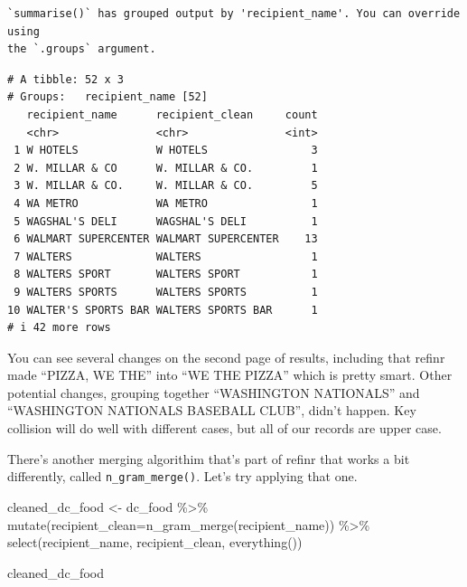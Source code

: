 \documentclass[
  letterpaper,
  DIV=11,
  numbers=noendperiod]{scrreprt}
\newenvironment{Shaded}{\begin{snugshade}}{\end{snugshade}}
\newcommand{\AttributeTok}[1]{\textcolor[rgb]{0.40,0.45,0.13}{#1}}
\newcommand{\FunctionTok}[1]{\textcolor[rgb]{0.28,0.35,0.67}{#1}}
\newcommand{\NormalTok}[1]{\textcolor[rgb]{0.00,0.23,0.31}{#1}}
\newcommand{\OtherTok}[1]{\textcolor[rgb]{0.00,0.23,0.31}{#1}}
\newcommand{\SpecialCharTok}[1]{\textcolor[rgb]{0.37,0.37,0.37}{#1}}
\begin{document}
\begin{verbatim}
`summarise()` has grouped output by 'recipient_name'. You can override using
the `.groups` argument.
\end{verbatim}

\begin{verbatim}
# A tibble: 52 x 3
# Groups:   recipient_name [52]
   recipient_name      recipient_clean     count
   <chr>               <chr>               <int>
 1 W HOTELS            W HOTELS                3
 2 W. MILLAR & CO      W. MILLAR & CO.         1
 3 W. MILLAR & CO.     W. MILLAR & CO.         5
 4 WA METRO            WA METRO                1
 5 WAGSHAL'S DELI      WAGSHAL'S DELI          1
 6 WALMART SUPERCENTER WALMART SUPERCENTER    13
 7 WALTERS             WALTERS                 1
 8 WALTERS SPORT       WALTERS SPORT           1
 9 WALTERS SPORTS      WALTERS SPORTS          1
10 WALTER'S SPORTS BAR WALTERS SPORTS BAR      1
# i 42 more rows
\end{verbatim}

You can see several changes on the second page of results, including
that refinr made ``PIZZA, WE THE'' into ``WE THE PIZZA'' which is pretty
smart. Other potential changes, grouping together ``WASHINGTON
NATIONALS'' and ``WASHINGTON NATIONALS BASEBALL CLUB'', didn't happen.
Key collision will do well with different cases, but all of our records
are upper case.

There's another merging algorithim that's part of refinr that works a
bit differently, called \texttt{n\_gram\_merge()}. Let's try applying
that one.

\begin{Shaded}
\begin{Highlighting}[]
\NormalTok{cleaned\_dc\_food }\OtherTok{\textless{}{-}}\NormalTok{ dc\_food }\SpecialCharTok{\%\textgreater{}\%}
  \FunctionTok{mutate}\NormalTok{(}\AttributeTok{recipient\_clean=}\FunctionTok{n\_gram\_merge}\NormalTok{(recipient\_name)) }\SpecialCharTok{\%\textgreater{}\%}
  \FunctionTok{select}\NormalTok{(recipient\_name, recipient\_clean, }\FunctionTok{everything}\NormalTok{())}

\NormalTok{cleaned\_dc\_food}
\end{Highlighting}
\end{Shaded}
\end{document}
